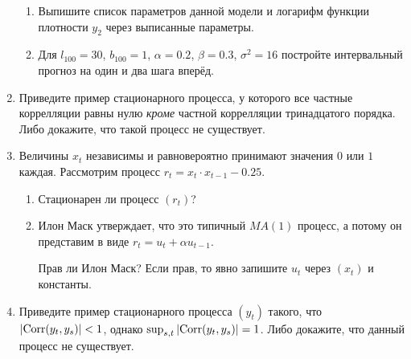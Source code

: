 \documentclass[12pt]{article}
\DeclareMathOperator{\Corr}{Corr}
\begin{document}
\begin{enumerate}
\begin{enumerate}
	\item Выпишите список параметров данной модели и логарифм функции плотности $y_2$ через выписанные параметры. 
	
	\item Для $l_{100} = 30$, $b_{100} = 1$, $\alpha=0.2$, $\beta=0.3$, $\sigma^2 = 16$ постройте
	интервальный прогноз на один и два шага вперёд. 
\end{enumerate}


\item Приведите пример стационарного процесса, 
у которого все частные коррелляции равны нулю \textit{кроме} частной коррелляции тринадцатого порядка.
Либо докажите, что такой процесс не существует. 


\item Величины $x_t$ независимы и равновероятно принимают значения $0$ или $1$ каждая. 
Рассмотрим процесс $r_t = x_t \cdot x_{t-1} - 0.25$.
\begin{enumerate}
	\item Стационарен ли процесс $(r_t)$?
	\item Илон Маск утверждает, что это типичный $MA(1)$ процесс, а потому он представим в виде $r_t = u_t + \alpha u_{t-1}$.
	
	Прав ли Илон Маск? Если прав, то явно запишите $u_t$ через $(x_t)$ и константы. 
\end{enumerate}

\item Приведите пример стационарного процесса $(y_t)$ такого, что $\abs{\Corr(y_t, y_s)} < 1$, 
однако $\sup_{s, t} \abs{\Corr(y_t, y_s)} = 1$. Либо докажите, что данный процесс не существует. 


\end{enumerate}
\end{document}
